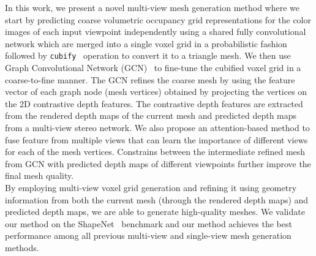 In this work, we present a novel multi-view mesh generation method where we start by predicting coarse volumetric occupancy grid representations for the color images of each input viewpoint independently using a shared fully convolutional network which are merged into a single voxel grid in a probabilistic fashion followed by \texttt{cubify}~\cite{gkioxari2019meshrcnn} operation to convert it to a triangle mesh. We then use Graph Convolutional Network (GCN)~\cite{scarselli2008graph,wang2018pixel2mesh} to fine-tune the cubified voxel grid in a coarse-to-fine manner. The GCN refines the coarse mesh by using the feature vector of each graph node (mesh vertices) obtained by projecting the vertices on the 2D contrastive depth features. The contrastive depth features are extracted from the rendered depth maps of the current mesh and predicted depth maps from a multi-view stereo network. We also propose an attention-based method to fuse feature from multiple views that can learn the importance of different views for each of the mesh vertices. Constrains between the intermediate refined mesh from GCN with predicted depth maps of different viewpoints further improve the final mesh quality.
\\
By employing multi-view voxel grid generation and refining it using geometry information from both the current mesh (through the rendered depth maps) and predicted depth maps, we are able to generate high-quality meshes.
We validate our method on the ShapeNet~\cite{chang2015shapenet} benchmark and our method achieves the best performance among all previous multi-view and single-view mesh generation methods.



